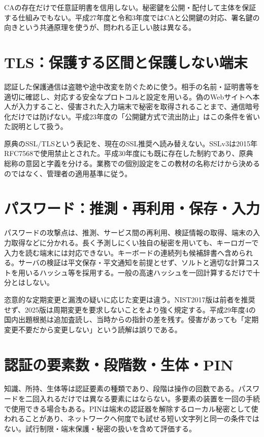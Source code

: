 CAの存在だけで任意証明書を信用しない。秘密鍵を公開・配付して主体を保証する仕組みでもない。平成27年度と令和3年度ではCAと公開鍵の対応、署名鍵の向きという共通原理を使うが、問われる正しい肢は異なる。

\section{TLS：保護する区間と保護しない端末}
\label{theory:network:tls}
認証した保護通信は盗聴や途中改変を防ぐために使う。相手の名前・証明書等を適切に確認し、対応する安全なプロトコルと設定を用いる。偽のWebサイトへ本人が入力すること、侵害された入力端末で秘密を取得されることまで、通信暗号化だけでは防げない。平成23年度の「公開鍵方式で流出防止」はこの条件を省いた説明として扱う。

原典のSSL/TLSという表記を、現在のSSL推奨へ読み替えない。SSLv3は2015年RFC7568で使用禁止とされた\cite{net_ssl2015}。平成30年度にも既に存在した制約であり、原典総称の意図と字義を分ける。業務での個別設定をこの教材の名称だけから決めるのではなく、管理者の適用基準に従う。

\section{パスワード：推測・再利用・保存・入力}
\label{theory:network:password}
パスワードの攻撃点は、推測、サービス間の再利用、検証情報の取得、端末の入力取得などに分かれる。長く予測しにくい独自の秘密を用いても、キーロガーで入力を読む端末には対応できない。キーボードの連続列も候補辞書へ含められる。サーバの検証は平文保存・平文通知を前提とせず、ソルトと適切な計算コストを用いるハッシュ等を採用する\cite{net_nist2025,net_ipa_account}。一般の高速ハッシュを一回計算するだけで十分とはしない。

恣意的な定期変更と漏洩の疑いに応じた変更は違う。NIST2017版は前者を推奨せず、2025版は周期変更を要求しないことをより強く規定する\cite{net_nist2017,net_nist2025}。平成29年度4の国内出題根拠は追加査読し、当時からの指針の差を残す。侵害があっても「定期変更不要だから変更しない」という読解は誤りである。

\section{認証の要素数・段階数・生体・PIN}
\label{theory:network:factors}
知識、所持、生体等は認証要素の種類であり、段階は操作の回数である。パスワードを二回入れるだけでは異なる要素にはならない。多要素の装置を一回の手続で使用できる場合もある。PINは端末の認証器を解除するローカル秘密として使われることがあり、ネットワークへ何度でも試せる短い文字列と同一の条件ではない。試行制限・端末保護・秘密の扱いを含めて評価する\cite{net_nist2025}。

